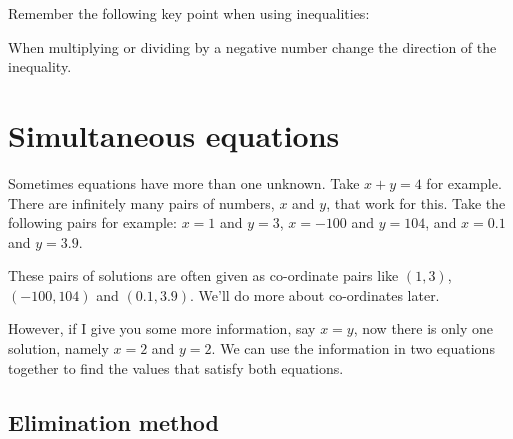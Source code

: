 \documentclass[
  a4paper,
]{scrbook}
\begin{document}
\begin{tcolorbox}[enhanced jigsaw, arc=.35mm, bottomrule=.15mm, bottomtitle=1mm, breakable, colback=white, colbacktitle=quarto-callout-note-color!10!white, colframe=quarto-callout-note-color-frame, coltitle=black, left=2mm, leftrule=.75mm, opacityback=0, opacitybacktitle=0.6, rightrule=.15mm, title=\textcolor{quarto-callout-note-color}{\faInfo}\hspace{0.5em}{Note}, titlerule=0mm, toprule=.15mm, toptitle=1mm]

Remember the following key point when using inequalities:

When multiplying or dividing by a negative number change the direction
of the inequality.

\end{tcolorbox}

\section{Simultaneous equations}\label{simultaneous-equations}

Sometimes equations have more than one unknown. Take \(x + y = 4\) for
example. There are infinitely many pairs of numbers, \(x\) and \(y\),
that work for this. Take the following pairs for example: \(x = 1\) and
\(y=3\), \(x = -100\) and \(y=104\), and \(x = 0.1\) and \(y=3.9\).

\begin{tcolorbox}[enhanced jigsaw, arc=.35mm, bottomrule=.15mm, bottomtitle=1mm, breakable, colback=white, colbacktitle=quarto-callout-tip-color!10!white, colframe=quarto-callout-tip-color-frame, coltitle=black, left=2mm, leftrule=.75mm, opacityback=0, opacitybacktitle=0.6, rightrule=.15mm, title=\textcolor{quarto-callout-tip-color}{\faLightbulb}\hspace{0.5em}{Pro-tip}, titlerule=0mm, toprule=.15mm, toptitle=1mm]

These pairs of solutions are often given as co-ordinate pairs like
\((1,3)\), \((-100,104)\) and \((0.1,3.9)\). We'll do more about
co-ordinates later.

\end{tcolorbox}

However, if I give you some more information, say \(x = y\), now there
is only one solution, namely \(x = 2\) and \(y=2\). We can use the
information in two equations together to find the values that satisfy
both equations.

\subsection{Elimination method}\label{elimination-method}
\end{document}
